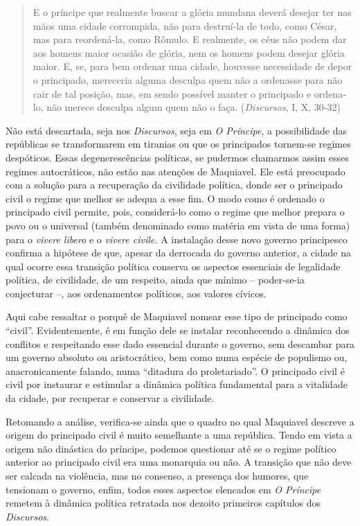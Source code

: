 \begin{quote}
E o príncipe que realmente buscar a glória mundana deverá desejar ter
nas mãos uma cidade corrompida, não para destruí-la de todo, como César,
mas para reordená-la, como Rômulo. E realmente, os céus não podem dar
aos homens maior ocasião de glória, nem os homens podem desejar glória
maior. E, se, para bem ordenar uma cidade, houvesse necessidade de depor
o principado, mereceria alguma desculpa quem não a ordenasse para não
cair de tal posição, mas, em sendo possível manter o principado e
ordena-lo, não merece desculpa algum quem não o faça. (\emph{Discursos},
I, X, 30-32)
\end{quote}

Não está descartada, seja nos \emph{Discursos}, seja em \emph{O
Príncipe}, a possibilidade das repúblicas se transformarem em tiranias
ou que os principados tornem-se regimes despóticos. Essas
degenerescências políticas, se pudermos chamarmos assim esses regimes
autocráticos, não estão nas atenções de Maquiavel. Ele está preocupado
com a solução para a recuperação da civilidade política, donde ser o
principado civil o regime que melhor se adequa a esse fim. O modo como é
ordenado o principado civil permite, pois, considerá-lo como o regime
que melhor prepara o povo ou o universal (também denominado como matéria
em vista de uma forma) para o \emph{vivere libero} e o \emph{vivere
civile.} A instalação desse novo governo principesco confirma a hipótese
de que, apesar da derrocada do governo anterior, a cidade na qual ocorre
essa transição política conserva os aspectos essenciais de legalidade
política, de civilidade, de um respeito, ainda que mínimo -- poder-se-ia
conjecturar --, aos ordenamentos políticos, aos valores cívicos.

Aqui cabe ressaltar o porquê de Maquiavel nomear esse tipo de principado
como ``civil''. Evidentemente, é em função dele se instalar reconhecendo
a dinâmica dos conflitos e respeitando esse dado essencial durante o
governo, sem descambar para um governo absoluto ou aristocrático, bem
como numa espécie de populismo ou, anacronicamente falando, numa
``ditadura do proletariado''. O principado civil é civil por instaurar e
estimular a dinâmica política fundamental para a vitalidade da cidade,
por recuperar e conservar a civilidade.

Retomando a análise, verifica-se ainda que o quadro no qual Maquiavel
descreve a origem do principado civil é muito semelhante a uma
república. Tendo em vista a origem não dinástica do príncipe, podemos
questionar até se o regime político anterior ao principado civil era uma
monarquia ou não. A transição que não deve ser calcada na violência, mas
no consenso, a presença dos humores, que tensionam o governo, enfim,
todos esses aspectos elencados em \emph{O Príncipe} remetem à dinâmica
política retratada nos dezoito primeiros capítulos dos \emph{Discursos}.


